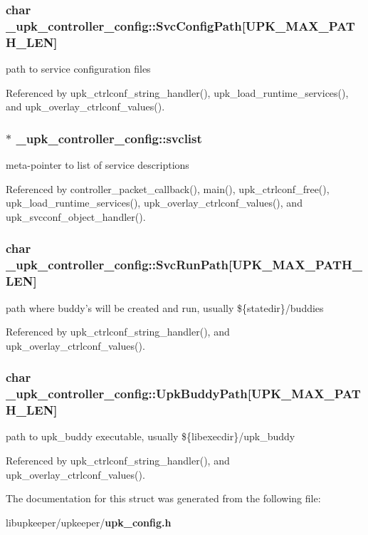 \subsubsection[{SvcConfigPath}]{\setlength{\rightskip}{0pt plus 5cm}char {\bf \_\-upk\_\-controller\_\-config::SvcConfigPath}[UPK\_\-MAX\_\-PATH\_\-LEN]}\label{struct__upk__controller__config_a6c1ae3807800dc927debc9b7132bf5a8}
path to service configuration files 

Referenced by upk\_\-ctrlconf\_\-string\_\-handler(), upk\_\-load\_\-runtime\_\-services(), and upk\_\-overlay\_\-ctrlconf\_\-values().

\subsubsection[{svclist}]{$\ast$ {\bf \_\-upk\_\-controller\_\-config::svclist}}\label{struct__upk__controller__config_a731925a4f4f2a7c1118e8f90405adcfe}
meta-\/pointer to list of service descriptions 

Referenced by controller\_\-packet\_\-callback(), main(), upk\_\-ctrlconf\_\-free(), upk\_\-load\_\-runtime\_\-services(), upk\_\-overlay\_\-ctrlconf\_\-values(), and upk\_\-svcconf\_\-object\_\-handler().

\subsubsection[{SvcRunPath}]{\setlength{\rightskip}{0pt plus 5cm}char {\bf \_\-upk\_\-controller\_\-config::SvcRunPath}[UPK\_\-MAX\_\-PATH\_\-LEN]}\label{struct__upk__controller__config_a7c3a09139aea23e02631c2c6c226a678}
path where buddy's will be created and run, usually \$\{statedir\}/buddies 

Referenced by upk\_\-ctrlconf\_\-string\_\-handler(), and upk\_\-overlay\_\-ctrlconf\_\-values().

\subsubsection[{UpkBuddyPath}]{\setlength{\rightskip}{0pt plus 5cm}char {\bf \_\-upk\_\-controller\_\-config::UpkBuddyPath}[UPK\_\-MAX\_\-PATH\_\-LEN]}\label{struct__upk__controller__config_a5ced0218af661e5e0886cf2035ad0b84}
path to upk\_\-buddy executable, usually \$\{libexecdir\}/upk\_\-buddy 

Referenced by upk\_\-ctrlconf\_\-string\_\-handler(), and upk\_\-overlay\_\-ctrlconf\_\-values().



The documentation for this struct was generated from the following file:\begin{DoxyCompactItemize}
\item 
libupkeeper/upkeeper/{\bf upk\_\-config.h}\end{DoxyCompactItemize}
